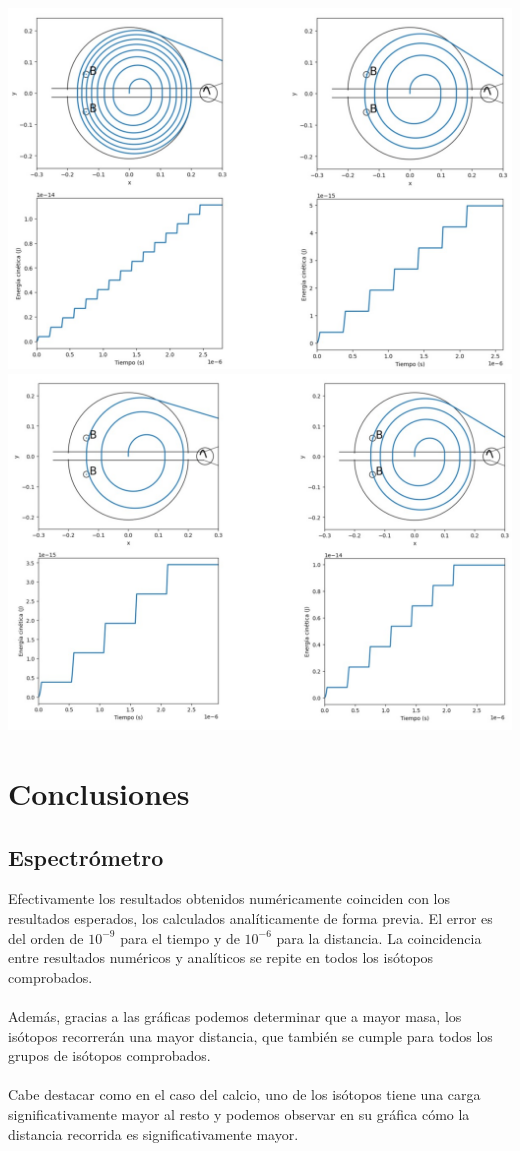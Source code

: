 \documentclass{article}
\begin{document}
\clearpage

\centering
\includegraphics[width=.95\textwidth]{lucas1.jpg}\\
\includegraphics[width=.95\textwidth]{lucas2.jpg}

\clearpage

\section{Conclusiones}
\justify
\subsection{Espectrómetro}
\noindent Efectivamente los resultados obtenidos numéricamente
coinciden con los resultados esperados, los calculados analíticamente de forma previa. El error es del orden de $10^{-9}$ para el tiempo y de $10^{-6}$ para la distancia. La coincidencia entre resultados numéricos y analíticos se repite en todos los isótopos comprobados. \\ \\
Además, gracias a las gráficas podemos determinar que a mayor masa, los isótopos recorrerán una mayor distancia, que también se cumple para todos los grupos de isótopos comprobados. \\ \\Cabe destacar como en el caso del calcio, uno de los isótopos tiene una carga significativamente mayor al resto y podemos observar en su gráfica cómo la distancia recorrida es significativamente mayor.
\vspace{0.5cm}
\end{document}
